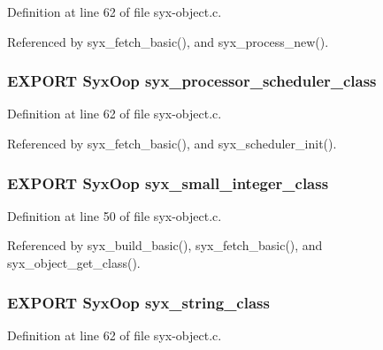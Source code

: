 Definition at line 62 of file syx-object.c.

Referenced by syx\_\-fetch\_\-basic(), and syx\_\-process\_\-new().\hypertarget{syx-object_8h_36a21dfe0c7f34b3f935ff11a48b6c0c}{
\subsubsection{\setlength{\rightskip}{0pt plus 5cm}EXPORT {\bf SyxOop} {\bf syx\_\-processor\_\-scheduler\_\-class}}}
\label{syx-object_8h_36a21dfe0c7f34b3f935ff11a48b6c0c}




Definition at line 62 of file syx-object.c.

Referenced by syx\_\-fetch\_\-basic(), and syx\_\-scheduler\_\-init().\hypertarget{syx-object_8h_7a13d4490f4ea23e10b62c5795dbf71a}{
\subsubsection{\setlength{\rightskip}{0pt plus 5cm}EXPORT {\bf SyxOop} {\bf syx\_\-small\_\-integer\_\-class}}}
\label{syx-object_8h_7a13d4490f4ea23e10b62c5795dbf71a}




Definition at line 50 of file syx-object.c.

Referenced by syx\_\-build\_\-basic(), syx\_\-fetch\_\-basic(), and syx\_\-object\_\-get\_\-class().\hypertarget{syx-object_8h_e1c7125650c6406bf4809ce106de8b36}{
\subsubsection{\setlength{\rightskip}{0pt plus 5cm}EXPORT {\bf SyxOop} {\bf syx\_\-string\_\-class}}}
\label{syx-object_8h_e1c7125650c6406bf4809ce106de8b36}




Definition at line 62 of file syx-object.c.

